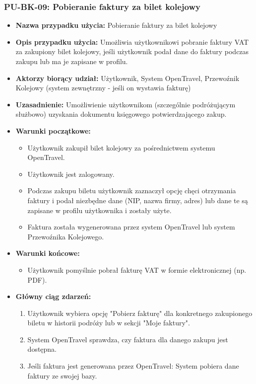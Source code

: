 \documentclass[a4paper,12pt]{article}
\begin{document}
\subsubsection{PU-BK-09: Pobieranie faktury za bilet kolejowy}
\begin{itemize}
\item \textbf{Nazwa przypadku użycia:} Pobieranie faktury za bilet kolejowy
\item \textbf{Opis przypadku użycia:} Umożliwia użytkownikowi pobranie faktury VAT za zakupiony bilet kolejowy, jeśli użytkownik podał dane do faktury podczas zakupu lub ma je zapisane w profilu.
\item \textbf{Aktorzy biorący udział:} Użytkownik, System OpenTravel, Przewoźnik Kolejowy (system zewnętrzny - jeśli on wystawia fakturę)
\item \textbf{Uzasadnienie:} Umożliwienie użytkownikom (szczególnie podróżującym służbowo) uzyskania dokumentu księgowego potwierdzającego zakup.
\item \textbf{Warunki początkowe:}
\begin{itemize}
\item Użytkownik zakupił bilet kolejowy za pośrednictwem systemu OpenTravel.
\item Użytkownik jest zalogowany.
\item Podczas zakupu biletu użytkownik zaznaczył opcję chęci otrzymania faktury i podał niezbędne dane (NIP, nazwa firmy, adres) lub dane te są zapisane w profilu użytkownika i zostały użyte.
\item Faktura została wygenerowana przez system OpenTravel lub system Przewoźnika Kolejowego.
\end{itemize}
\item \textbf{Warunki końcowe:}
\begin{itemize}
\item Użytkownik pomyślnie pobrał fakturę VAT w formie elektronicznej (np. PDF).
\end{itemize}
\item \textbf{Główny ciąg zdarzeń:}
\begin{enumerate}
\item Użytkownik wybiera opcję "Pobierz fakturę" dla konkretnego zakupionego biletu w historii podróży lub w sekcji "Moje faktury".
\item System OpenTravel sprawdza, czy faktura dla danego zakupu jest dostępna.
\item Jeśli faktura jest generowana przez OpenTravel: System pobiera dane faktury ze swojej bazy.

\end{enumerate}
\end{itemize}
\end{document}

